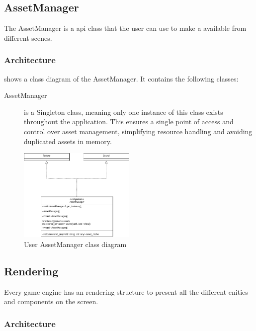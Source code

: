 \documentclass{projdoc}
\begin{document}
\subsection{AssetManager}

The AssetManager is a \gls{api} class that the user can use to make a
 available from different scenes.

\subsubsection{Architecture}

 shows a class diagram of the AssetManager. It contains
the following classes:\noparbreak
\begin{description}
	\item[AssetManager] is a Singleton class, meaning only one instance of this class
		exists throughout the application. This ensures a single point of access and
		control over asset management, simplifying resource handling and avoiding
		duplicated assets in memory.
\end{description}

\begin{figure}
	\centering
	\includegraphics[width=0.5\textwidth]{img/AssesManager.png}
	\caption{User AssetManager class diagram}
	\label{fig:class-assetmanager}
\end{figure}

\subsection{Rendering}

Every game engine has an rendering structure to present all the different enities and
components on the screen.

\subsubsection{Architecture}
\end{document}
